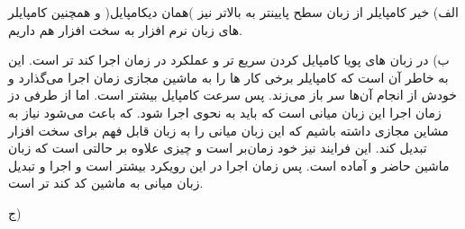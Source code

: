 


الف) خیر کامپایلر از زبان سطح پایینتر به بالاتر نیز )همان دیکامپایل( و همچنین کامپایلر های زبان نرم افزار به سخت افزار هم داریم.

ب) در زبان های پویا کامپایل کردن سریع تر و عملکرد در زمان اجرا کند تر است. \newline
این به خاطر آن است که کامپایلر برخی کار ها را به ماشین مجازی زمان اجرا می‌گذارد و خودش از انجام آن‌ها سر باز می‌زند. پس سرعت کامپایل بیشتر است. اما از طرفی دز زمان اجرا این زبان میانی است که باید به نحوی اجرا شود. که باعث می‌شود نیاز به مشاین مجازی داشته باشیم که این زبان میانی را به زبان قابل فهم برای سخت افزار تبدیل کند. این فرایند نیز خود زمان‌بر است و چیزی علاوه بر حالتی است که زبان ماشین حاضر و آماده است. پس زمان اجرا در این رویکرد بیشتر است و اجرا و تبدیل زبان میانی به ماشین کد کند تر است. \newline

ج) 

\begin{latin}
\end{latin}
